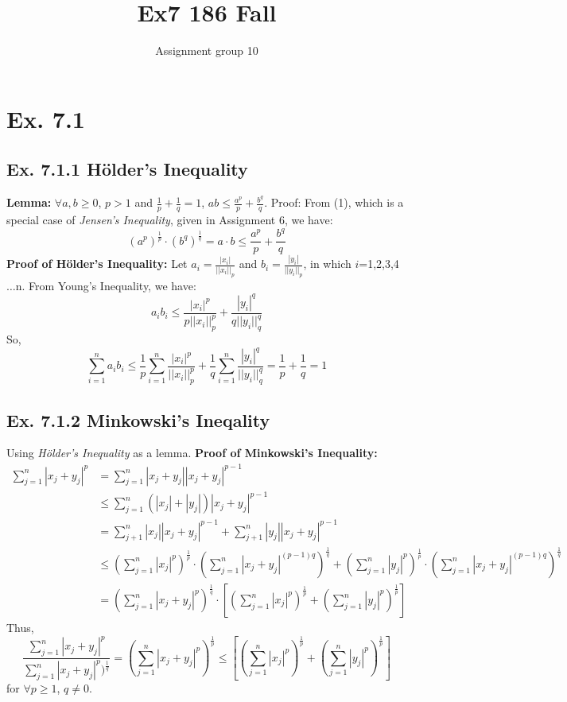 \documentclass[11pt,twoside,a4paper]{article}
\begin{document}
\title{Ex7 186 Fall}
\author{Assignment group 10}
\date{}
\maketitle
\section{Ex. 7.1}
\subsection{Ex. 7.1.1 Hölder's Inequality}
\textbf{Lemma: }
\newline
$\forall a,b\geq 0$, $p>1$ and $\frac{1}{p}+\frac{1}{q}=1$, $ab\leq\frac{a^{p}}{p}+\frac{b^{q}}{q}$.
\newline
Proof: From (1), which is a special case of \textit{Jensen's Inequality}, given in Assignment 6, we have:
$$(a^{p})^{\frac{1}{p}}\cdot (b^{q})^{\frac{1}{q}}=a\cdot b\leq \frac{a^{p}}{p}+\frac{b^{q}}{q}$$
\newline
\textbf{Proof of Hölder's Inequality:}
\newline
Let $a_{i}=\frac{|x_{i}|}{||x_{i}||_{p}}$ and $b_{i}=\frac{|y_{i}|}{||y_{i}||_{p}}$, in which $i$=1,2,3,4$\ldots$n.
\newline
From Young's Inequality, we have:
$$a_{i}b_{i}\leq\frac{|x_{i}|^{p}}{p||x_{i}||^{p}_{p}}+\frac{|y_{i}|^{q}}{q||y_{i}||^{q}_{q}}$$
So,$$\sum_{i=1}^{n} a_{i}b_{i}\leq\frac{1}{p}\sum_{i=1}^{n}\frac{|x_{i}|^{p}}{||x_{i}||^{p}_{p}}+\frac{1}{q}\sum_{i=1}^{n}\frac{|y_{i}|^{q}}{||y_{i}||^{q}_{q}}=\frac{1}{p}+\frac{1}{q}=1
$$
\subsection{Ex. 7.1.2 Minkowski's Ineqality}
Using \textit{Hölder's Inequality} as a lemma.\newline
\textbf{Proof of Minkowski's Inequality: }\begin{align*}
\sum_{j=1}^{n} |x_j + y_j|^p &= \sum_{j=1}^{n} |x_j + y_j||x_j + y_j|^{p-1}\\
&\leq\sum_{j=1}^{n} (|x_j|+|y_j|)|x_j + y_j|^{p-1}\\
&=\sum_{j+1}^{n} |x_j||x_j +y_j|^{p-1}+\sum_{j+1}^{n} |y_j||x_j +y_j|^{p-1}\\
&\leq (\sum_{j=1}^{n} |x_j|^p)^{\frac{1}{p}}\cdot (\sum_{j=1}^{n} |x_j +y_j|^{(p-1)q})^{\frac{1}{q}}+(\sum_{j=1}^{n} |y_j|^p)^{\frac{1}{p}}\cdot (\sum_{j=1}^{n} |x_j +y_j|^{(p-1)q})^{\frac{1}{q}}\\
&=(\sum_{j=1}^{n} |x_j +y_j|^{p})^{\frac{1}{q}}\cdot [(\sum_{j=1}^{n} |x_j|^p)^{\frac{1}{p}}+(\sum_{j=1}^{n} |y_j|^p)^{\frac{1}{p}}]
\end{align*}
Thus, $$\frac{\sum_{j=1}^{n} |x_j + y_j|^p}{\sum_{j=1}^{n} |x_j +y_j|^{p})^{\frac{1}{q}}}=(\sum_{j=1}^{n} |x_j + y_j|^p)^{\frac{1}{p}}\leq [(\sum_{j=1}^{n} |x_j|^p)^{\frac{1}{p}}+(\sum_{j=1}^{n} |y_j|^p)^{\frac{1}{p}}]$$for $\forall p\geq 1$, $q\neq 0$.\newline
{}
\end{document}
